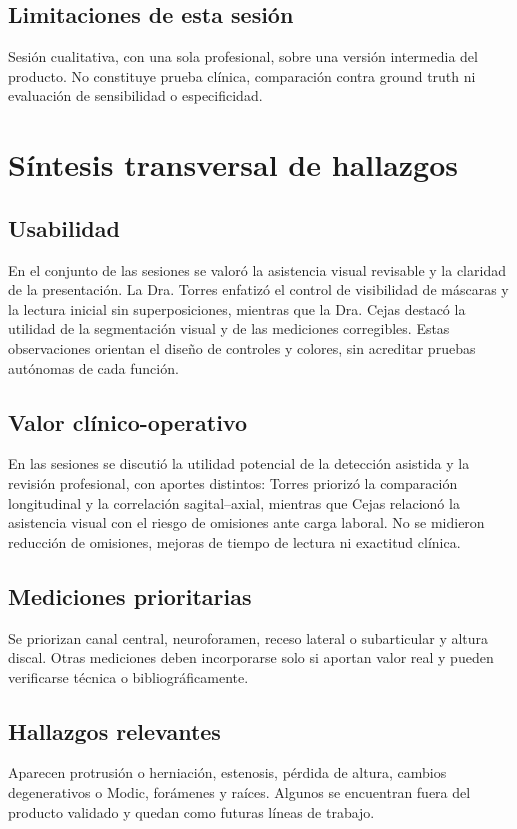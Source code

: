 \subsection*{Limitaciones de esta sesión}
Sesión cualitativa, con una sola profesional, sobre una versión intermedia del producto. No constituye prueba clínica, comparación contra ground truth ni evaluación de sensibilidad o especificidad.

\section{Síntesis transversal de hallazgos}
\label{anexo:h-sintesis-transversal}

\subsection*{Usabilidad}
En el conjunto de las sesiones se valoró la asistencia visual revisable y la claridad de la presentación. La Dra. Torres enfatizó el control de visibilidad de máscaras y la lectura inicial sin superposiciones, mientras que la Dra. Cejas destacó la utilidad de la segmentación visual y de las mediciones corregibles. Estas observaciones orientan el diseño de controles y colores, sin acreditar pruebas autónomas de cada función.

\subsection*{Valor clínico-operativo}
En las sesiones se discutió la utilidad potencial de la detección asistida y la revisión profesional, con aportes distintos: Torres priorizó la comparación longitudinal y la correlación sagital--axial, mientras que Cejas relacionó la asistencia visual con el riesgo de omisiones ante carga laboral. No se midieron reducción de omisiones, mejoras de tiempo de lectura ni exactitud clínica.

\subsection*{Mediciones prioritarias}
Se priorizan canal central, neuroforamen, receso lateral o subarticular y altura discal. Otras mediciones deben incorporarse solo si aportan valor real y pueden verificarse técnica o bibliográficamente.

\subsection*{Hallazgos relevantes}
Aparecen protrusión o herniación, estenosis, pérdida de altura, cambios degenerativos o Modic, forámenes y raíces. Algunos se encuentran fuera del producto validado y quedan como futuras líneas de trabajo.

